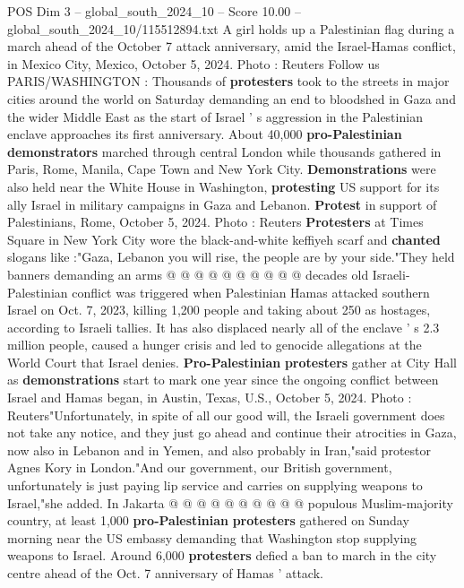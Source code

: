 \begin{textsample}{POS Dim 3 – global\_south\_2024\_10 – Score 10.00 – global\_south\_2024\_10/115512894.txt}  \label{ex:f3_pos_362}
A girl holds up a Palestinian flag during a march ahead of the October 7 attack anniversary, amid the Israel-Hamas conflict, in Mexico City, Mexico, October 5, 2024.
Photo : Reuters Follow us PARIS/WASHINGTON : Thousands of \textbf{protesters} took to the streets in major cities around the world on Saturday demanding an end to bloodshed in Gaza and the wider Middle East as the start of Israel ' s aggression in the Palestinian enclave approaches its first anniversary.
About 40,000 \textbf{pro-Palestinian} \textbf{demonstrators} marched through central London while thousands gathered in Paris, Rome, Manila, Cape Town and New York City. \textbf{Demonstrations} were also held near the White House in Washington, \textbf{protesting} US support for its ally Israel in military campaigns in Gaza and Lebanon. \textbf{Protest} in support of Palestinians, Rome, October 5, 2024.
Photo : Reuters \textbf{Protesters} at Times Square in New York City wore the black-and-white keffiyeh scarf and \textbf{chanted} slogans like :"Gaza, Lebanon you will rise, the people are by your side."They held banners demanding an arms @ @ @ @ @ @ @ @ @ @ decades old Israeli-Palestinian conflict was triggered when Palestinian Hamas attacked southern Israel on Oct. 7, 2023, killing 1,200 people and taking about 250 as hostages, according to Israeli tallies.
It has also displaced nearly all of the enclave ' s 2.3 million people, caused a hunger crisis and led to genocide allegations at the World Court that Israel denies. \textbf{Pro-Palestinian} \textbf{protesters} gather at City Hall as \textbf{demonstrations} start to mark one year since the ongoing conflict between Israel and Hamas began, in Austin, Texas, U.S., October 5, 2024.
Photo : Reuters"Unfortunately, in spite of all our good will, the Israeli government does not take any notice, and they just go ahead and continue their atrocities in Gaza, now also in Lebanon and in Yemen, and also probably in Iran,"said protestor Agnes Kory in London."And our government, our British government, unfortunately is just paying lip service and carries on supplying weapons to Israel,"she added.
In Jakarta @ @ @ @ @ @ @ @ @ @ populous Muslim-majority country, at least 1,000 \textbf{pro-Palestinian} \textbf{protesters} gathered on Sunday morning near the US embassy demanding that Washington stop supplying weapons to Israel.
Around 6,000 \textbf{protesters} defied a ban to march in the city centre ahead of the Oct. 7 anniversary of Hamas ' attack.

\end{textsample}

